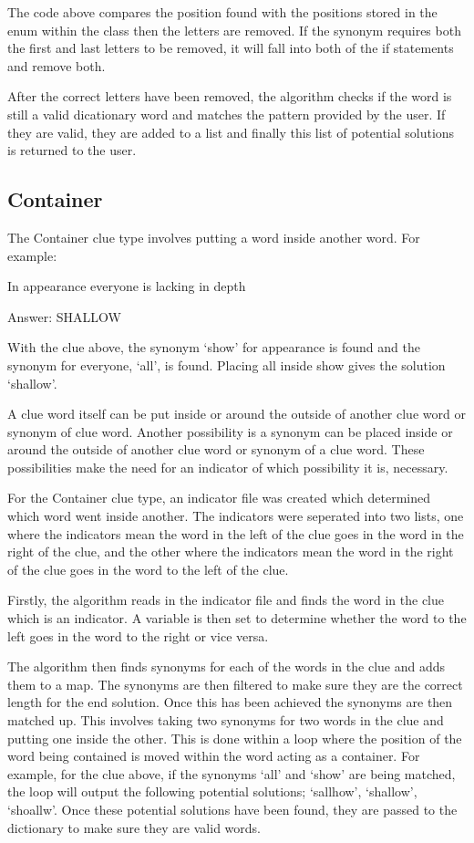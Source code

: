 The code above compares the position found with the positions 
stored in the enum within the class then the letters are removed. 
If the synonym requires both the first and last letters to be removed, 
it will fall into both of the if statements and remove both. 

After the correct letters have been removed, the algorithm checks 
if the word is still a valid dicationary word and matches the pattern 
provided by the user. If they are valid, they are added to a list and 
finally this list of potential solutions is returned to the user. 

\subsection{Container}

The Container clue type involves putting a word inside another word.
 For example: 

In appearance everyone is lacking in depth

Answer: SHALLOW

With the clue above, the synonym `show' for appearance is found 
and the synonym for everyone, `all', is found. Placing all inside show 
gives the solution `shallow'. 

A clue word itself can be put inside or around the outside of another clue 
word or synonym of clue word. Another possibility is a synonym can be 
placed inside or around the outside of another clue word or synonym of 
a clue word. These possibilities make the need for an indicator of which 
possibility it is, necessary. 

For the Container clue type, an indicator file was created which determined 
which word went inside another. The indicators were seperated into two 
lists, one where the indicators mean the word in the left of the clue goes in 
the word in the right of the clue, and the other where the indicators mean 
the word in the right of the clue goes in the word to the left of the clue. 

Firstly, the algorithm reads in the indicator file and finds the word in the 
clue which is an indicator. A variable is then set to determine whether the 
word to the left goes in the word to the right or vice versa. 

The algorithm then finds synonyms for each of the words in the clue and adds
 them to a map. The synonyms are then filtered to make sure they are the 
correct length for the end solution. Once this has been achieved the synonyms
 are then matched up. This involves taking two synonyms for two words in the
 clue and putting one inside the other. This is done within a loop where the 
position of the word being contained is moved within the word acting as a 
container. For example, for the clue above, if the synonyms `all' and `show' 
are being matched, the loop will output the following potential solutions; 
`sallhow', `shallow', `shoallw'. Once these potential solutions have been 
found, they are passed to the dictionary to make sure they are valid words. 

